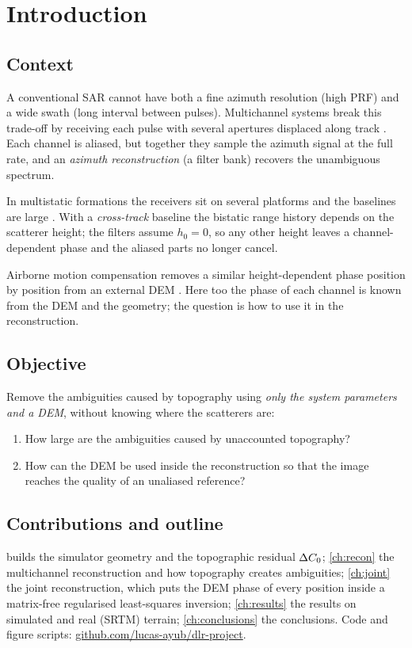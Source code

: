 \chapter{Introduction}\label{ch:intro}

\section{Context}

A conventional SAR cannot have both a fine azimuth resolution (high PRF) and a wide swath (long interval between pulses). Multichannel systems break this trade-off by receiving each pulse
with several apertures displaced along track \cite{Krieger2004,Gebert2009}. Each channel is aliased, but together they
sample the azimuth signal at the full rate, and an \emph{azimuth reconstruction} (a filter bank) recovers the unambiguous
spectrum.

In multistatic formations the receivers sit on several platforms and the baselines are large
\cite{Sakar2020tgrs,Sakar2022thesis}. With a \emph{cross-track} baseline the bistatic range history depends on the
scatterer height; the filters assume $h_0=0$, so any other height leaves a channel-dependent phase and the aliased parts
no longer cancel.

Airborne motion compensation removes a similar height-dependent phase position by position from an external DEM
\cite{Prats2005topo,Prats2005thesis,Prats2007moco}. Here too the phase of each channel is known from the DEM and the
geometry; the question is how to use it in the reconstruction.

\section{Objective}

Remove the ambiguities caused by topography using \emph{only the system parameters and a DEM}, without knowing where the
scatterers are:
\begin{enumerate}
  \item How large are the ambiguities caused by unaccounted topography?
  \item How can the DEM be used inside the reconstruction so that the image reaches the quality of an unaliased reference?
\end{enumerate}

\section{Contributions and outline}

 builds the simulator geometry and the topographic residual ${\Delta C_0}$; \cref{ch:recon} the multichannel
reconstruction and how topography creates ambiguities; \cref{ch:joint} the joint reconstruction, which puts the DEM phase of
every position inside a matrix-free regularised least-squares inversion; \cref{ch:results} the results on simulated and real
(SRTM) terrain; \cref{ch:conclusions} the conclusions. Code and figure scripts:
\href{https://github.com/lucas-ayub/dlr-project}{github.com/lucas-ayub/dlr-project}.
